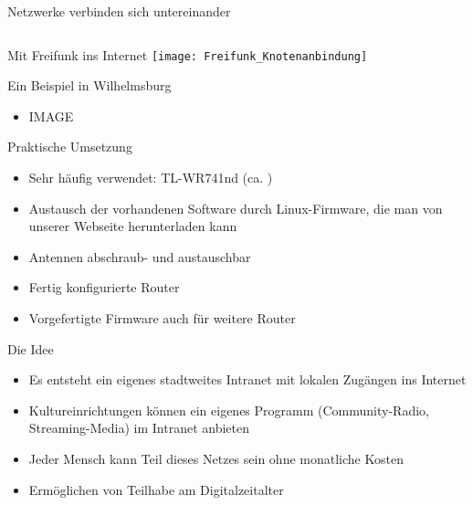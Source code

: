 \documentclass[c]{beamer}
\begin{document}
\begin{frame}{Netzwerke verbinden sich untereinander}
\begin{columns}[c]
\begin{column}[r]{.5\textwidth}
{{}}
		\end{column}
	\end{columns}
\end{frame}

\begin{frame}{Mit Freifunk ins Internet}
	\texttt{[image: Freifunk\_Knotenanbindung]}
\end{frame}

\begin{frame}{Ein Beispiel in Wilhelmsburg}
	\begin{itemize}
		\item IMAGE
	\end{itemize}
\end{frame}


\begin{frame}{Praktische Umsetzung}
	\begin{itemize}
		\item Sehr häufig verwendet: TL-WR741nd (ca. )
		\item Austausch der vorhandenen Software durch Linux-Firmware, die man von unserer Webseite herunterladen kann
		\item Antennen abschraub- und austauschbar
		\item Fertig konfigurierte Router
		\item Vorgefertigte Firmware auch für weitere Router
	\end{itemize}
\end{frame}

\begin{frame}{Die Idee}
	\begin{itemize}
		\item Es entsteht ein eigenes stadtweites Intranet mit lokalen Zugängen ins Internet
		\item Kultureinrichtungen können ein eigenes Programm (Community-Radio, Streaming-Media) im Intranet anbieten
		\item Jeder Mensch kann Teil dieses Netzes sein ohne monatliche Kosten
		\item Ermöglichen von Teilhabe am Digitalzeitalter
	\end{itemize}
\end{frame}
\end{document}
